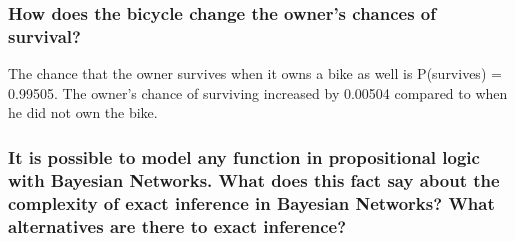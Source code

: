 \documentclass[a4paper,10pt]{article}
\begin{document}
 \subsubsection{How does the bicycle change the owner's chances of survival?}

 The chance that the owner survives when it owns a bike as well is P(survives) = 0.99505.
 The owner's chance of surviving increased by 0.00504 compared to when he did not own the bike.

 \subsubsection{It is possible to model any function in propositional logic with Bayesian Networks. 
 What does this fact say about the complexity of exact inference in Bayesian Networks? 
 What alternatives are there to exact inference? }

 
\end{document}
